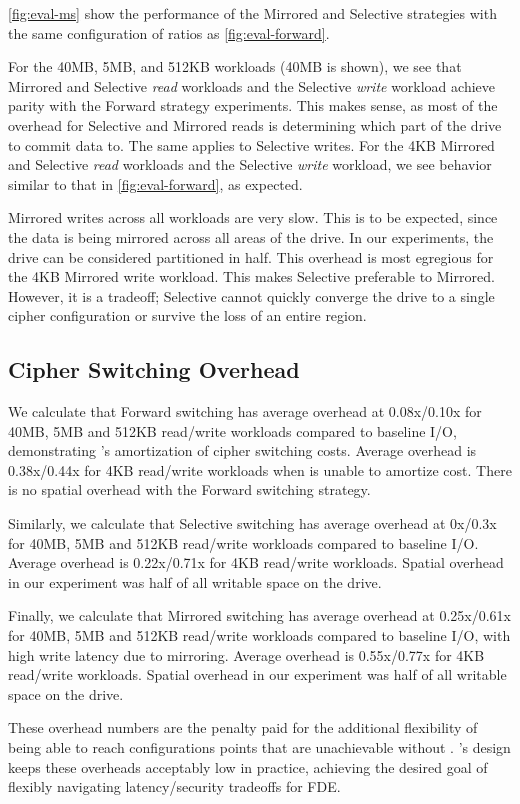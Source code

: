 

\cref{fig:eval-ms} show the performance of the Mirrored and Selective strategies
with the same configuration of ratios as \cref{fig:eval-forward}.

For the 40MB, 5MB, and 512KB workloads (40MB is shown), we see that Mirrored and
Selective \emph{read} workloads and the Selective \emph{write} workload achieve
parity with the Forward strategy experiments. This makes sense, as most of the
overhead for Selective and Mirrored reads is determining which part of the drive
to commit data to. The same applies to Selective writes. For the 4KB Mirrored
and Selective \emph{read} workloads and the Selective \emph{write} workload, we
see behavior similar to that in \cref{fig:eval-forward}, as expected.

Mirrored writes across all workloads are very slow. This is to be expected,
since the data is being mirrored across all areas of the drive. In our
experiments, the drive can be considered partitioned in half. This overhead is
most egregious for the 4KB Mirrored write workload. This makes Selective
preferable to Mirrored. However, it is a tradeoff; Selective cannot quickly
converge the drive to a single cipher configuration or survive the loss of an
entire region.


\subsection{Cipher Switching Overhead}\label{subsec:eval-overhead}

We calculate that Forward switching has average overhead at 0.08x/0.10x for
40MB, 5MB and 512KB read/write workloads compared to baseline I/O, demonstrating
\sys's amortization of cipher switching costs. Average overhead is\\0.38x/0.44x
for 4KB read/write workloads when \sys is unable to amortize cost. There is no
spatial overhead with the Forward switching strategy.

Similarly, we calculate that Selective switching has average overhead at 0x/0.3x
for 40MB, 5MB and 512KB read/write workloads compared to baseline I/O. Average
overhead is 0.22x/0.71x for 4KB read/write workloads. Spatial overhead in our
experiment was half of all writable space on the drive.

Finally, we calculate that Mirrored switching has average overhead at
0.25x/0.61x for 40MB, 5MB and 512KB read/write workloads compared to baseline
I/O, with high write latency due to mirroring. Average overhead is 0.55x/0.77x
for 4KB read/write workloads. Spatial overhead in our experiment was half of all
writable space on the drive.

These overhead numbers are the penalty paid for the additional flexibility of
being able to reach configurations points that are unachievable without \sys.
\sys's design keeps these overheads acceptably low in practice, achieving the
desired goal of flexibly navigating latency/security tradeoffs for FDE.
